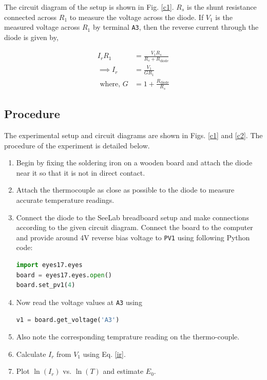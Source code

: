 The circuit diagram of the setup is shown in Fig. \ref{c1}. $R_s$ is the shunt resistance connected across $R_1$ to measure the voltage across the diode. If $V_1$ is the measured voltage across $R_1$ by terminal \verb|A3|, then the reverse current through the diode is given by,

\begin{align} \label{ir}
    I_r R_1 &= \frac{V_1 R_s}{R_s + R_\text{diode}} \nonumber\\
    \implies I_r &= \frac{V_1}{GR_1}\\\text{ where, } G &= 1+ \frac{R_\text{diode}}{R_s} \nonumber
\end{align}

\subsection{Procedure}
The experimental setup and circuit diagrams are shown in Figs. \ref{c1} and \ref{c2}. The procedure of the experiment is detailed below.\\

\begin{enumerate}
    \item Begin by fixing the soldering iron on a wooden board and attach the diode near it so that it is not in direct contact.
    \item Attach the thermocouple as close as possible to the diode to measure accurate temperature readings.
    \item Connect the diode to the SeeLab breadboard setup and make connections according to the given circuit diagram. Connect the board to the computer and provide around 4V reverse bias voltage to \verb|PV1| using following Python code:
    \begin{lstlisting}[language=Python]
import eyes17.eyes
board = eyes17.eyes.open()
board.set_pv1(4)
\end{lstlisting}        
    \item Now read the voltage values at \verb|A3| using  
    \begin{lstlisting}[language=Python]
v1 = board.get_voltage('A3')
\end{lstlisting}  
\item Also note the corresponding temprature reading on the thermo-couple.
    \item Calculate $I_r$ from $V_1$ using Eq. \ref{ir}.
    \item Plot $\ln(I_r)$ vs. $\ln(T)$ and estimate $E_0$.
\end{enumerate}